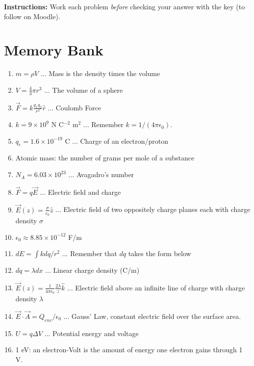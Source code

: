 \documentclass[10pt]{article}
\begin{document}
\maketitle

\textbf{Instructions:} Work each problem \textit{before} checking your answer with the key (to follow on Moodle). \\ \vspace{0.25cm}

\section{Memory Bank}

\begin{enumerate}
\item $m = \rho V$ ... Mass is the density times the volume
\item $V = \frac{4}{3}\pi r^3$ ... The volume of a sphere
\item $\vec{F} = k \frac{q_1 q_2}{r^2}\hat{r}$ ... Coulomb Force
\item $k = 9 \times 10^{9}$ N C$^{-2}$ m$^{2}$ ... Remember $k = 1/(4\pi \epsilon_0)$.
\item $q_e = 1.6 \times 10^{-19}$ C ... Charge of an electron/proton
\item Atomic mass: the number of grams per mole of a substance
\item $N_A = 6.03 \times 10^{23}$ ... Avagadro's number
\item $\vec{F} = q \vec{E}$ ... Electric field and charge
\item $\vec{E}(z) = \frac{\sigma}{\epsilon_0}\hat{z}$ ... Electric field of two oppositely charge planes each with charge density $\sigma$
\item $\epsilon_0 \approx 8.85 \times 10^{-12}$ F/m
\item $dE = \int k dq / r^2$ ... Remember that $dq$ takes the form below
\item $dq = \lambda dx$ ... Linear charge density (C/m)
\item $\vec{E}(z) = \frac{1}{4\pi\epsilon_0} \frac{2\lambda}{z} \hat{k}$ ... Electric field above an infinite line of charge with charge density $\lambda$
\item $\vec{E} \cdot \vec{A} = Q_{enc}/\epsilon_0$ ... Gauss' Law, constant electric field over the surface area.
\item $U = q\Delta V$ ... Potential energy and voltage
\item 1 eV: an electron-Volt is the amount of energy one electron gains through 1 V.

\end{enumerate}
\end{document}
